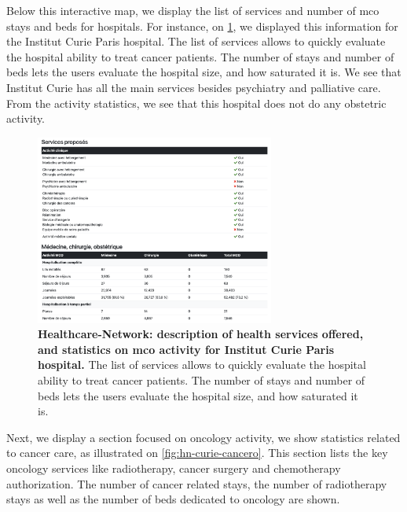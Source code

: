 Below this interactive map, we display the list of services and number of
\ac{mco} stays and beds for hospitals. For instance, on
\cref{fig:hn-curie-services}, we displayed this information for the Institut
Curie Paris hospital. The list of services allows to quickly evaluate the
hospital ability to treat cancer patients. The number of stays and number of
beds lets the users evaluate the hospital size, and how saturated it is. We see
that Institut Curie has all the main services besides psychiatry and palliative
care. From the activity statistics, we see that this hospital does not do any
obstetric activity.

\begin{figure}[h]
    \includegraphics[width=0.7\textwidth]{images/healthcare-network/curie-services.png}
    \centering
    \caption{ \textbf{Healthcare-Network: description of health services
            offered, and statistics on \ac{mco} activity for Institut Curie Paris
            hospital.} The list of services allows to quickly evaluate the
        hospital ability to treat cancer patients. The number of stays and number of
        beds lets the users evaluate the hospital size, and how saturated it is.}
    \label{fig:hn-curie-services}
\end{figure}

Next, we display a section focused on oncology activity, we show statistics
related to cancer care, as illustrated on \cref{fig:hn-curie-cancero}. This
section lists the key oncology services like radiotherapy, cancer surgery and
chemotherapy authorization. The number of cancer related stays, the number of
radiotherapy stays as well as the number of beds dedicated to oncology are
shown.

